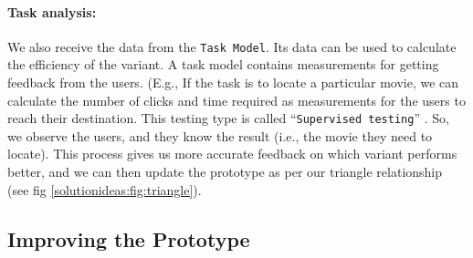 
\paragraph{Task analysis:}
\label{solutionideas:paragraph:taskanalysis}
We also receive the data from the \texttt{Task Model}. 
Its data can be used to calculate the efficiency of the variant. A task model contains measurements for getting feedback from the users. (E.g., If the task is to locate a particular movie, we can calculate the number of clicks and time required as measurements for the users to reach their destination.
This testing type is called ``\texttt{Supervised testing}'' \cite{article:dataanalysis:supervisedtest}.
So, we observe the users, and they know the result (i.e., the movie they need to locate). 
This process gives us more accurate feedback on which variant performs better, and we can then update the prototype as per our triangle relationship (see fig \ref{solutionideas:fig:triangle}).

\subsection{Improving the Prototype}
\label{solutionideas:subsection:improvingprototypes}